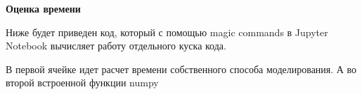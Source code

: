 \documentclass[a4paper,12pt, oneside]{book}
\begin{document}
{{\begin{center}
	\begin{minipage}[h]{0.4\linewidth}
	\end{minipage}
\end{center}


\vspace{5mm}
{\large{\bf Оценка времени}}
\vspace{5mm}

Ниже будет приведен код, который с помощью magic commands в Jupyter Notebook вычисляет работу отдельного куска кода. 

В первой ячейке идет расчет времени собственного способа моделирования. А во второй встроенной функции numpy

\vspace{5mm}
\begin{minipage}[h]{0.4\linewidth}
\end{minipage}
\vspace{5mm}

\vspace{5mm}
\begin{minipage}[h]{0.4\linewidth}
\end{minipage}
\vspace{5mm}


}}
\end{document}
